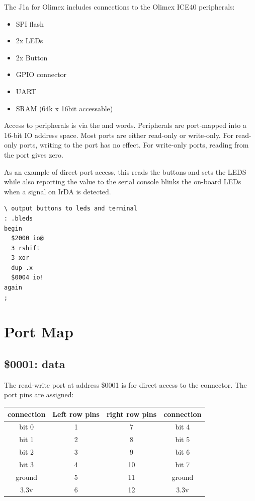 The J1a for Olimex includes connections to the Olimex ICE40 peripherals:
\begin{itemize}
\item SPI flash 
\item 2x LEDs 
\item 2x Button 
\item \GPIO{} GPIO connector 
\item UART 
\item SRAM (64k x 16bit accessable)
\end{itemize}

Access to peripherals is via the
 and  words.
Peripherals are port-mapped into a 16-bit IO address space.
Most ports are either read-only or write-only.
For read-only ports, writing to the port has no effect.
For write-only ports, reading from the port gives zero.

As an example of direct port access, this reads the buttons and sets the LEDS while also reporting the value to the serial console
blinks the on-board LEDs when a signal on IrDA is detected. 

\begin{framed}
\begin{Verbatim}
\ output buttons to leds and terminal
: .bleds
begin
  $2000 io@
  3 rshift
  3 xor
  dup .x
  $0004 io!
again
;
\end{Verbatim}
\end{framed}

\newpage
\section{Port Map}
\subsection{\$0001: \GPIO{} data}

The read-write port at address \$0001 is for direct access to the \GPIO{}
connector. The port pins are assigned:

\vspace{10pt}
\begin{tabular}{cccc}
\textbf{connection} & \textbf{Left row pins} & \textbf{right row pins} & \textbf{connection} \\
\hline
bit 0 & 1 &  7 & bit 4 \\
bit 1 & 2 &  8 & bit 5 \\
bit 2 & 3 &  9 & bit 6 \\
bit 3 & 4 & 10 & bit 7 \\
ground & 5 & 11 & ground \\
3.3v & 6 & 12 & 3.3v \\
\end{tabular}
\vspace{10pt}

